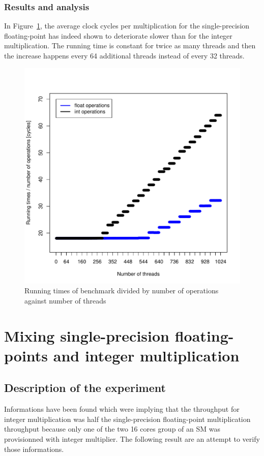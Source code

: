 \documentclass{article}
\def \scalingfactor{.8}
\begin{document}
	\subsubsection{Results and analysis}
	In Figure~\ref{fig:latencyestimate}, the average clock cycles per multiplication for the single-precision floating-point has indeed shown to deteriorate slower than for the integer multiplication. The running time is constant for twice as many threads and then the increase happens every 64 additional threads instead of every 32 threads.
	\begin{figure}[h]
		\centering
		\vspace{-20pt}
    			\includegraphics[width=\scalingfactor\linewidth]{"graphics/latency_estimate"}
		\vspace{-15pt}
		\caption{Running times of benchmark divided by number of operations against number of threads}
		\label{fig:latencyestimate}
	\end{figure}
	\pagebreak

\section{Mixing single-precision floating-points and integer multiplication}
	\subsection{Description of the experiment}
	Informations have been found which were implying that the throughput for integer multiplication was half the single-precision floating-point multiplication throughput because only one of the two 16 cores group of an SM was provisionned with integer multiplier.
	The following result are an attempt to verify those informations.
\end{document}
